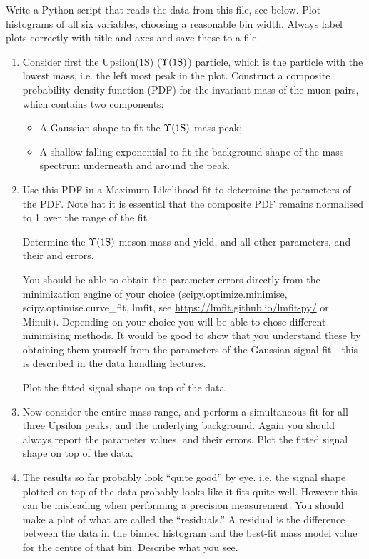 Write a Python script that reads the data from this file, see below. Plot histograms of all six variables, choosing a reasonable bin width. Always label plots correctly with title and axes and save these to a file. 


\vspace*{-0.5cm}


\begin{enumerate}
\item Consider first the Upsilon(1S) ($\Upsilon \rm (1S)$) particle, which is the particle with the lowest mass, i.e. the left most  peak in the plot. Construct a composite probability density function (PDF) for the invariant mass of the muon pairs, which contains two components:
\begin{itemize}
\item A Gaussian shape to fit the  $\Upsilon \rm (1S)$ mass peak;
\item A shallow falling exponential to fit the background shape of the mass spectrum underneath and around the peak.
\end{itemize}

\item	Use this PDF in a Maximum Likelihood fit to determine the parameters of the PDF. Note hat it is essential that the composite PDF remains normalised to 1 over the range of the fit.

Determine the $\Upsilon \rm (1S)$  meson mass and yield, and all other parameters, and their and errors.

You should be able to obtain the parameter errors directly from the minimization engine of your choice (scipy.optimize.minimise, scipy.optimise.curve\_fit, lmfit, see \url{https://lmfit.github.io/lmfit-py/} or Minuit). Depending on your choice you will be able to chose different minimising methods.
It would be good to show that you understand these by obtaining them yourself from the parameters of the Gaussian signal fit - this is described in the data handling lectures.

Plot the fitted signal shape on top of the data.

\item Now consider the entire mass range, and perform a simultaneous fit for all three Upsilon peaks, and the underlying background. Again you should always report the parameter values, and their errors. Plot the fitted signal shape on top of the data.

\item The results so far probably look ``quite good'' by eye.  i.e. the signal shape plotted on top of the data probably looks like it fits quite well.  However this can be misleading when performing a precision measurement.  You should make a plot of what are called the ``residuals.'' A residual is the difference between the data in the binned histogram and the best-fit mass model value for the centre of that bin. Describe what you see.


\end{enumerate}
